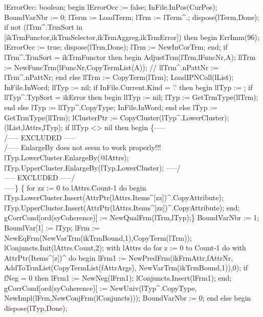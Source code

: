    lErrorOcc: boolean;
begin
   lErrorOcc := false;
   InFile.InPos(CurPos); BoundVarNbr := 0;
   lTerm := LoadTerm;
   lTrm := lTerm^.;
   dispose(lTerm,Done);
   if not (lTrm^.TrmSort in [ikTrmFunctor,ikTrmSelector,ikTrmAggreg,ikTrmError]) then
   begin
      ErrImm(96);
      lErrorOcc := true;
      dispose(lTrm,Done);
      lTrm := NewInCorTrm;
   end;
   if lTrm^.TrmSort = ikTrmFunctor then
   begin
      AdjustTrm(lTrm,lFuncNr,A);
      llTrm := NewFuncTrm(lFuncNr,CopyTermList(A));
      //   llTrm^.nPattNr := lTrm^.nPattNr;
   end
   else llTrm := CopyTerm(lTrm);
   LoadIPNColl(lList);
   InFile.InWord;
   llTyp := nil;
   if InFile.Current.Kind = '.' then
   begin
      llTyp := ;
      if llTyp^.TypSort = ikError then
      begin
         llTyp := nil;
         lTyp := GetTrmType(llTrm);
      end
      else lTyp := llTyp^.CopyType;
      InFile.InWord;
   end
   else lTyp := GetTrmType(llTrm);
   lClusterPtr := CopyCluster(lTyp^.LowerCluster);
   (lList,lAttrs,lTyp);
   if llTyp <> nil then
   begin
\{-----\\/----- EXCLUDED -----\\/----- EnlargeBy does not seem to work properly!!!
   lTyp.LowerCluster.EnlargeBy(@lAttrs);
   lTyp.UpperCluster.EnlargeBy(lTyp.LowerCluster);
 -----/\\----- EXCLUDED -----/\\-----\}
\{    for zz := 0 to lAttrs.Count-1 do
       begin
          lTyp.LowerCluster.Insert(AttrPtr(lAttrs.Items^[zz])^.CopyAttribute);
          lTyp.UpperCluster.Insert(AttrPtr(lAttrs.Items^[zz])^.CopyAttribute);
       end;
   gCorrCond[ord(syCoherence)] := NewQualFrm(lTrm,lTyp);\}
      BoundVarNbr := 1;
      BoundVar[1] := lTyp;
      lFrm := NewEqFrm(NewVarTrm(ikTrmBound,1),CopyTerm(lTrm));
      lConjuncts.Init(lAttrs.Count,2);
      with lAttrs do
         for z := 0 to Count-1 do
            with AttrPtr(Items^[z])^ do
         begin
            lFrm1 := NewPredFrm(ikFrmAttr,fAttrNr,
                                AddToTrmList(CopyTermList(fAttrArgs),
                                             NewVarTrm(ikTrmBound,1)),0);
            if fNeg = 0 then
               lFrm1 := NewNeg(lFrm1);
            lConjuncts.Insert(lFrm1);
         end;
      gCorrCond[ord(syCoherence)] := NewUniv(lTyp^.CopyType,
                                             NewImpl(lFrm,NewConjFrm(lConjuncts)));
      BoundVarNbr := 0;
   end
   else
   begin
      dispose(lTyp,Done);

